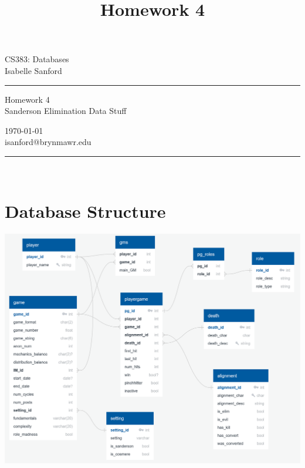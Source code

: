 \documentclass[11pt, oneside]{amsart}   	%
\begin{document}
\title{Homework 4} %
\fancyhead[C]{}
\begin{minipage}{0.295\textwidth} %
\raggedright
CS383: Databases\\ %
\footnotesize %
Isabelle Sanford %
\medskip\hrule
\end{minipage}
\begin{minipage}{0.4\textwidth} %
\centering 
\large %
Homework 4\\ %
\normalsize %
Sanderson Elimination Data Stuff \\ %
\end{minipage}
\begin{minipage}{0.295\textwidth} %
\raggedleft
\today \\
\footnotesize %
isanford@brynmawr.edu%
\medskip\hrule
\end{minipage}\\

\section{Database Structure}

\includegraphics[scale=0.5]{../diagrams/se diagram v3.png}
\end{document}
